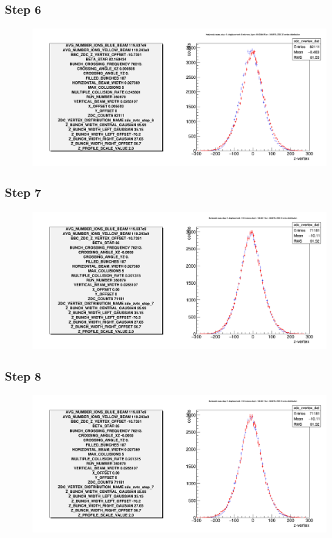 \begin{frame}
  \frametitle{Step 6}
  \begin{figure}
    \includegraphics[width=\linewidth]{"./figures/tuned_simulation_step_6"}
    \caption{}
    \label{fig:step_6}
  \end{figure}
\end{frame}

\begin{frame}
  \frametitle{Step 7}
  \begin{figure}
    \includegraphics[width=\linewidth]{"./figures/tuned_simulation_step_7"}
    \caption{}
    \label{fig:step_7}
  \end{figure}
\end{frame}

\begin{frame}
  \frametitle{Step 8}
  \begin{figure}
    \includegraphics[width=\linewidth]{"./figures/tuned_simulation_step_8"}
    \caption{}
    \label{fig:step_8}
  \end{figure}
\end{frame}

